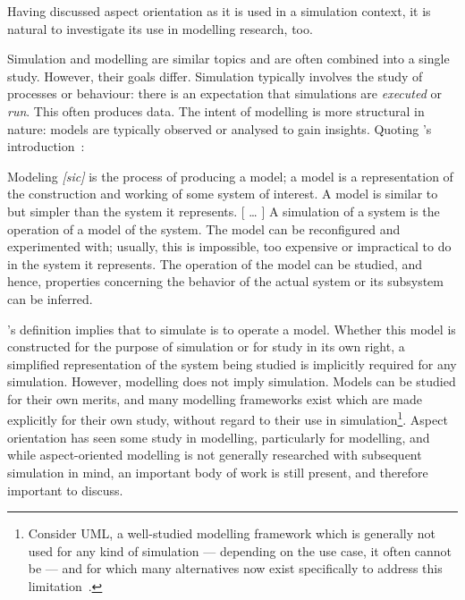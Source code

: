 

Having discussed aspect orientation as it is used in a simulation context, it is
natural to investigate its use in modelling research, too.

Simulation and modelling are similar topics and are often combined into a single
study. However, their goals differ. Simulation typically involves the study of
processes or behaviour: there is an expectation that simulations are
\emph{executed} or \emph{run}. This often produces data. The intent of modelling
is more structural in nature: models are typically observed or analysed to gain
insights. Quoting \citeauthor{smintro}'s introduction~\cite{smintro}:

\begin{displayquote}
    Modeling \emph{[sic]} is the process of producing a model; a model
    is a representation of the construction and working of
    some system of interest. A model is similar to but
    simpler than the system it represents.
    \newline{}
    [ \ldots{} ]
    \newline{}
    A simulation of a system is the operation of a model of the system. The
    model can be reconfigured and experimented with; usually, this is
    impossible, too expensive or impractical to do in the system it represents.
    The operation of the model can be studied, and hence, properties concerning
    the behavior of the actual system or its subsystem can be inferred.
\end{displayquote}

\citeauthor{smintro}'s definition implies that to simulate is to operate a
model. Whether this model is constructed for the purpose of simulation or for
study in its own right, a simplified representation of the system being studied
is implicitly required for any simulation. However, modelling does not imply
simulation. Models can be studied for their own merits, and many modelling
frameworks exist which are made explicitly for their own study, without regard
to their use in simulation\footnote{Consider UML, a well-studied modelling
framework which is generally not used for any kind of simulation --- depending
on the use case, it often cannot be --- and for which many alternatives now
exist specifically to address this
limitation~\cite{opm_original,ExecutableBPMNMitsyuk,obashimethodology}.}. Aspect
orientation has seen some study in modelling, particularly for \sociotechnical
modelling, and while aspect-oriented \sociotechnical modelling is not generally
researched with subsequent simulation in mind, an important body of work is
still present, and therefore important to discuss.

